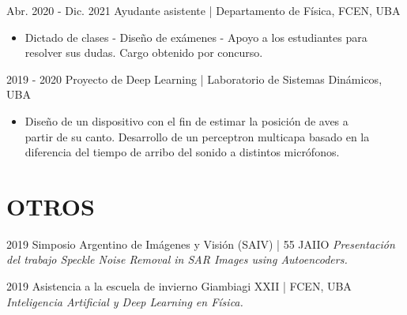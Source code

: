 \documentclass[]{friggeri-cv_reccius-experiment}
\begin{document}
\begin{entrylist}
  \entry
    {Abr. 2020 - Dic. 2021\space\space\enspace}
    {Ayudante asistente | }{{\small Departamento de Física, FCEN, UBA}}
    {}
    {\jobspace
    \vspace{0.1cm}
    \begin{itemize}[leftmargin=*, itemsep = 0.4em]
    \item Dictado de clases - Diseño de exámenes - Apoyo a los estudiantes para\\ resolver sus dudas. Cargo obtenido por concurso.\\
    \end{itemize}
    \vspace{0.15cm}
    }
    
  \entry
    {2019 - 2020\enspace}
    {Proyecto de Deep Learning | }{{\small Laboratorio de Sistemas Dinámicos, UBA}}
    {}
    {\jobspace
    \vspace{0.1cm}
    \begin{itemize}[leftmargin=*, itemsep = 0.4em]
    \item Diseño de un dispositivo con el fin de estimar la posición de aves a\\ partir de su canto. Desarrollo de un perceptron multicapa basado en la\\ diferencia del tiempo de arribo del sonido a distintos micrófonos.
    \end{itemize}
    \vspace{0.55cm}
    }
    
\end{entrylist}
\vspace{0.25cm}

\section{OTROS}
\begin{entrylist}

  \entry
    {2019\enspace}
    {Simposio Argentino de Imágenes y Visión (SAIV) | }{{\small 55 JAIIO}}
    {}
    {\jobspace
    \vspace{0.1cm}
    \textit{Presentación del trabajo Speckle Noise Removal in SAR Images using Autoencoders.}
    \vspace{0.85cm}
    }
    
  \entry
    {2019\enspace}
    {Asistencia a la escuela de invierno Giambiagi XXII | }{{\small FCEN, UBA}}
    {}
    {\jobspace
    \vspace{0.1cm}
    \textit{Inteligencia Artificial y Deep Learning en Física.}
    \vspace{0.85cm}
    }
\end{entrylist}
\end{document}
